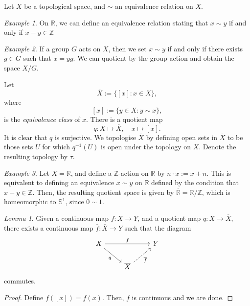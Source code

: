 \documentclass[a4paper]{report}
\theoremstyle{definition}
\theoremstyle{remark}
\theoremstyle{proposition}
\theoremstyle{conjecture}
\theoremstyle{lemma}
\newtheorem{lemma}{Lemma}
\theoremstyle{corollary}
\theoremstyle{exercise}
\newtheorem{example}{Example}
\begin{document}
Let $X$ be a topological space, and $\sim$ an equivalence relation on $X$.
\begin{example}
    On $\mathbb{R}$, we can define an equivalence relation 
    stating that $x\sim y$ if and only if $x-y \in \mathbb{Z}$
\end{example}

\begin{example}
    If a group $G$ acts on $X$, then we set $x \sim y$ if and only if 
    there exists $g \in G$ such that $x = yg$. We can quotient by the 
    group action and obtain the space $X/G$.
\end{example}

Let $$\overline{X} := \lbrace [x] : x \in X\rbrace,$$
where $$[x] :=\lbrace y \in X : y \sim x\rbrace,$$
is the \emph{equivalence class} of $x$. 
There is a quotient map
$$q : X \longmapsto \overline{X},\quad x \longmapsto [x].$$
It is clear that $q$ is surjective.
We topologise $\overline{X}$ by defining open sets in $\overline{X}$
to be those sets $U$ for which $q^{-1}(U)$ is open under the topology on $X$.
Denote the resulting topology by $\overline{\tau}$.

\begin{example}
    Let $X = \mathbb{R}$, and define a $\mathbb{Z}$-action on 
    $\mathbb{R}$ by $n \cdot x := x + n$. This is equivalent to defining
    an equivalence $x \sim y$ on $\mathbb{R}$ defined by the condition that 
    $x-y \in \mathbb{Z}$. Then, the resulting quotient space is given by 
    $\overline{\mathbb{R}} = \mathbb{R}/\mathbb{Z}$, which is homeomorphic
    to $\mathbb{S}^1$, since $0\sim 1$.
\end{example}

\begin{lemma}
    Given a continuous map $f : X \to Y$, and 
    a quotient map $q : X \to \overline{X}$, there exists a 
    continuous map $\overline{f} : \overline{X} \to Y$ such that the diagram
    $$\begin{tikzcd}
X \arrow[rd, "q"'] \arrow[rr, "f"] &                                                  & Y \\
                                   & \overline{X} \arrow[ru, "\overline{f}"', dashed] &  
\end{tikzcd}$$
    commutes.
\end{lemma}

\begin{proof}
    Define $\overline{f}([x]) = f(x)$. Then, $\overline{f}$ is continuous
    and we are done.
\end{proof}
\end{document}
